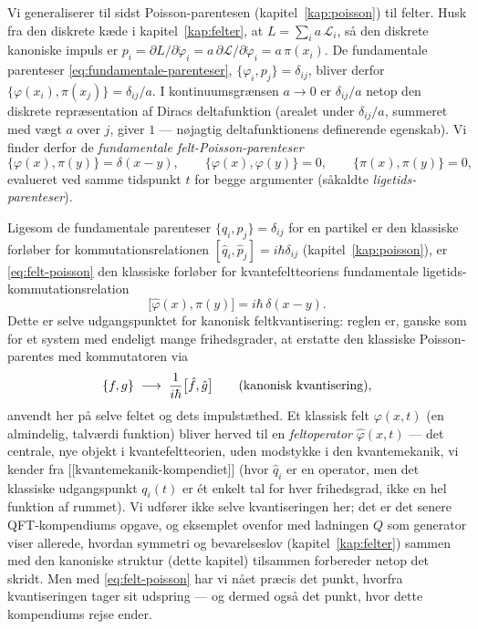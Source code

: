 Vi generaliserer til sidst Poisson-parentesen (kapitel~\ref{kap:poisson})
til felter. Husk fra den diskrete kæde i
kapitel~\ref{kap:felter}, at $L=\sum_i a\,\mathcal{L}_i$, så den
diskrete kanoniske impuls er $p_i=\partial L/\partial\dot\varphi_i =
a\,\partial\mathcal{L}/\partial\dot\varphi_i = a\,\pi(x_i)$. De
fundamentale parenteser \eqref{eq:fundamentale-parenteser},
$\{\varphi_i,p_j\}=\delta_{ij}$, bliver derfor
$\{\varphi(x_i),\pi(x_j)\} = \delta_{ij}/a$. I kontinuumsgrænsen
$a\to0$ er $\delta_{ij}/a$ netop den diskrete repræsentation af
Diracs deltafunktion (arealet under $\delta_{ij}/a$, summeret med
vægt $a$ over $j$, giver $1$ — nøjagtig deltafunktionens
definerende egenskab). Vi finder derfor de \emph{fundamentale
felt-Poisson-parenteser}
\begin{equation}
  \boxed{\{\varphi(x),\pi(y)\} = \delta(x-y), \qquad
  \{\varphi(x),\varphi(y)\} = 0, \qquad \{\pi(x),\pi(y)\} = 0,}
  \label{eq:felt-poisson}
\end{equation}
evalueret ved samme tidspunkt $t$ for begge argumenter (såkaldte
\emph{ligetids-parenteser}).

\begin{bemaerkning}
Ligesom de fundamentale parenteser $\{q_i,p_j\}=\delta_{ij}$ for en
partikel er den klassiske forløber for kommutationsrelationen
$[\hat q_i,\hat p_j]=i\hbar\delta_{ij}$ (kapitel~\ref{kap:poisson}), er
\eqref{eq:felt-poisson} den klassiske forløber for kvantefeltteoriens
fundamentale ligetids-kommutationsrelation
\begin{equation}
  \bigl[\hat\varphi(x),\hat\pi(y)\bigr] = i\hbar\,\delta(x-y).
\end{equation}
Dette er selve udgangspunktet for kanonisk feltkvantisering: reglen
er, ganske som for et system med endeligt mange frihedsgrader, at
erstatte den klassiske Poisson-parentes med kommutatoren via
\begin{equation}
  \{f,g\} \;\longrightarrow\; \frac{1}{i\hbar}\bigl[\hat f,\hat g\bigr]
  \qquad\text{(kanonisk kvantisering}\index{kanonisk kvantisering}\text{)},
\end{equation}
anvendt her på selve feltet og dets impulstæthed. Et klassisk felt
$\varphi(x,t)$ (en almindelig, talværdi funktion) bliver herved til en
\emph{feltoperator} $\hat\varphi(x,t)$ — det centrale, nye objekt i
kvantefeltteorien, uden modstykke i den kvantemekanik, vi kender fra
[[kvantemekanik-kompendiet]] (hvor $\hat q_i$ er en operator, men det
klassiske udgangspunkt $q_i(t)$ er ét enkelt tal for hver frihedsgrad,
ikke en hel funktion af rummet). Vi udfører ikke selve kvantiseringen
her; det er det senere QFT-kompendiums opgave, og eksemplet ovenfor
med ladningen $Q$ som generator viser allerede, hvordan symmetri og
bevarelseslov (kapitel~\ref{kap:felter}) sammen med den kanoniske
struktur (dette kapitel) tilsammen forbereder netop det skridt. Men
med \eqref{eq:felt-poisson} har vi nået præcis det punkt, hvorfra
kvantiseringen tager sit udspring — og dermed også det punkt, hvor
dette kompendiums rejse ender.
\end{bemaerkning}

